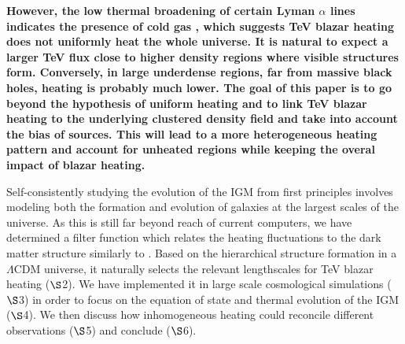 \documentclass[twocolumns]{emulateapj}
\newcommand\ALc[1]{{\color{red} \bf #1}} %
\begin{document}
\ALc{However, the low thermal broadening of certain Lyman $\alpha$ lines indicates the presence of cold gas \citep{2012ApJ...757L..30R}, which suggests TeV blazar heating does not uniformly heat the whole universe.  It is natural to expect a larger TeV flux close to higher density regions where visible structures form. Conversely, in large underdense regions, far from massive black holes, heating is probably much lower. The goal of this paper is to go beyond the hypothesis of uniform heating and to link TeV blazar heating to the underlying clustered density field and take into account the bias of sources. This will lead to a more heterogeneous heating pattern and account for unheated regions while keeping the overal impact of blazar heating.


Self-consistently studying the evolution of the IGM from first principles involves modeling both the formation and evolution of galaxies  at the largest scales of the universe. As this is still far beyond reach of current computers, we have determined a filter function which relates the heating fluctuations to the dark matter structure similarly to \citet{2007MNRAS.376.1680P,2005ApJ...626....1B,2014PhRvD..89h3010P}. Based on the hierarchical structure formation in a $\Lambda$CDM universe, it naturally selects the relevant lengthscales for TeV blazar heating ($\S$2). We have implemented it in large scale cosmological simulations ($\S$3) in order to  focus on the equation of state and thermal evolution of the  IGM ($\S$4). We then discuss how inhomogeneous heating could reconcile different observations ($\S$5)  and conclude ($\S$6).







}
\end{document}
